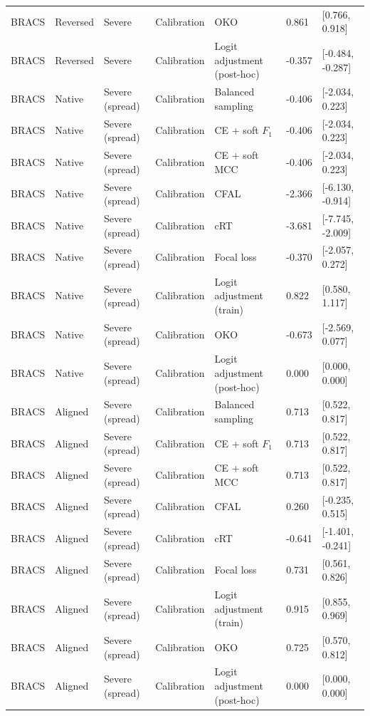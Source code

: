 \begin{longtable}{lllllll}
BRACS & Reversed & Severe & Calibration & OKO & 0.861 & [0.766, 0.918] \\
BRACS & Reversed & Severe & Calibration & Logit adjustment (post-hoc) & -0.357 & [-0.484, -0.287] \\
BRACS & Native & Severe (spread) & Calibration & Balanced sampling & -0.406 & [-2.034, 0.223] \\
BRACS & Native & Severe (spread) & Calibration & CE + soft $F_1$ & -0.406 & [-2.034, 0.223] \\
BRACS & Native & Severe (spread) & Calibration & CE + soft MCC & -0.406 & [-2.034, 0.223] \\
BRACS & Native & Severe (spread) & Calibration & CFAL & -2.366 & [-6.130, -0.914] \\
BRACS & Native & Severe (spread) & Calibration & cRT & -3.681 & [-7.745, -2.009] \\
BRACS & Native & Severe (spread) & Calibration & Focal loss & -0.370 & [-2.057, 0.272] \\
BRACS & Native & Severe (spread) & Calibration & Logit adjustment (train) & 0.822 & [0.580, 1.117] \\
BRACS & Native & Severe (spread) & Calibration & OKO & -0.673 & [-2.569, 0.077] \\
BRACS & Native & Severe (spread) & Calibration & Logit adjustment (post-hoc) & 0.000 & [0.000, 0.000] \\
BRACS & Aligned & Severe (spread) & Calibration & Balanced sampling & 0.713 & [0.522, 0.817] \\
BRACS & Aligned & Severe (spread) & Calibration & CE + soft $F_1$ & 0.713 & [0.522, 0.817] \\
BRACS & Aligned & Severe (spread) & Calibration & CE + soft MCC & 0.713 & [0.522, 0.817] \\
BRACS & Aligned & Severe (spread) & Calibration & CFAL & 0.260 & [-0.235, 0.515] \\
BRACS & Aligned & Severe (spread) & Calibration & cRT & -0.641 & [-1.401, -0.241] \\
BRACS & Aligned & Severe (spread) & Calibration & Focal loss & 0.731 & [0.561, 0.826] \\
BRACS & Aligned & Severe (spread) & Calibration & Logit adjustment (train) & 0.915 & [0.855, 0.969] \\
BRACS & Aligned & Severe (spread) & Calibration & OKO & 0.725 & [0.570, 0.812] \\
BRACS & Aligned & Severe (spread) & Calibration & Logit adjustment (post-hoc) & 0.000 & [0.000, 0.000] \\

\end{longtable}
